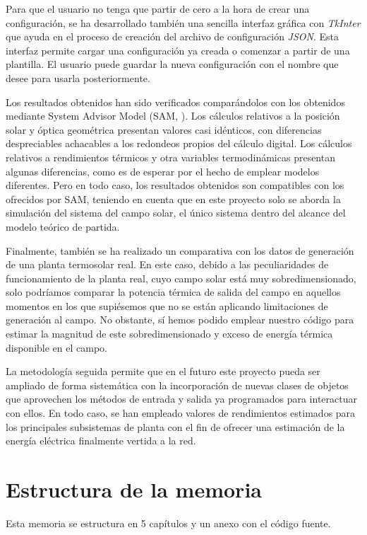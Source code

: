 Para que el usuario no tenga que partir de cero a la hora de crear una configuración, se ha desarrollado también una sencilla interfaz gráfica con \emph{TkInter} \cite{TkInterPythonWiki}  que ayuda en el proceso de creación del archivo de configuración \emph{JSON}. Esta interfaz permite cargar una configuración ya creada o comenzar a partir de una plantilla. El usuario puede guardar la nueva configuración con el nombre que desee para usarla posteriormente.

Los resultados obtenidos han sido verificados comparándolos con los obtenidos mediante System Advisor Model (SAM, \cite{freemanSystemAdvisorModel2018}). Los cálculos relativos a la posición solar y óptica geométrica presentan valores casi idénticos, con diferencias despreciables achacables a los redondeos propios del cálculo digital. Los cálculos relativos a rendimientos térmicos y otra variables termodinámicas presentan algunas diferencias, como es de esperar por el hecho de emplear modelos diferentes. Pero en todo caso, los resultados obtenidos son compatibles con los ofrecidos por SAM, teniendo en cuenta que en este proyecto solo se aborda la simulación del sistema del campo solar, el único sistema dentro del alcance del modelo teórico de partida. 

Finalmente, también se ha realizado un comparativa con los datos de generación de una planta termosolar real. En este caso, debido a las peculiaridades de funcionamiento de la planta real, cuyo campo solar está muy sobredimensionado, solo podríamos comparar la potencia térmica de salida del campo en aquellos momentos en los que supiésemos que no se están aplicando limitaciones de generación al campo. No obstante, sí hemos podido emplear nuestro código para estimar la magnitud de este sobredimensionado y exceso de energía térmica disponible en el campo. 

La metodología seguida permite que en el futuro este proyecto pueda ser ampliado de forma sistemática con la incorporación de nuevas clases de objetos que aprovechen los métodos de entrada y salida ya programados para interactuar con ellos. En todo caso, se han empleado valores de rendimientos estimados para los principales subsistemas de planta con el fin de ofrecer una estimación de la energía eléctrica finalmente vertida a la red.


\section{Estructura de la memoria}
Esta memoria se estructura en 5 capítulos y un anexo con el código fuente.

